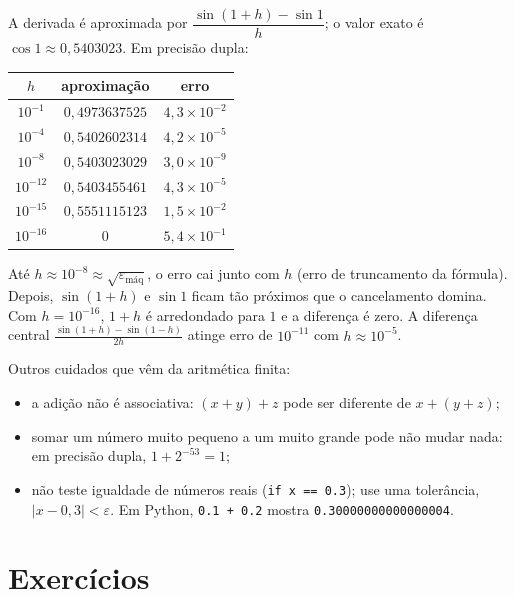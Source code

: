 \begin{exemplo}[{: derivada numérica de $\sin x$ em $x=1$}]
A derivada é aproximada por $\dfrac{\sin(1+h)-\sin 1}{h}$; o valor exato é $\cos1\approx0{,}5403023$. Em precisão dupla:

\begin{center}
\small
\begin{tabular}{ccc}
\toprule
$h$ & aproximação & erro\\
\midrule
$10^{-1}$  & $0{,}4973637525$ & $4{,}3\times10^{-2}$\\
$10^{-4}$  & $0{,}5402602314$ & $4{,}2\times10^{-5}$\\
$10^{-8}$  & $0{,}5403023029$ & $3{,}0\times10^{-9}$\\
$10^{-12}$ & $0{,}5403455461$ & $4{,}3\times10^{-5}$\\
$10^{-15}$ & $0{,}5551115123$ & $1{,}5\times10^{-2}$\\
$10^{-16}$ & $0$ & $5{,}4\times10^{-1}$\\
\bottomrule
\end{tabular}
\end{center}

Até $h\approx10^{-8}\approx\sqrt{\varepsilon_{\text{máq}}}$, o erro cai junto com $h$ (erro de truncamento da
fórmula). Depois, $\sin(1+h)$ e $\sin1$ ficam tão próximos que o cancelamento domina. Com
$h=10^{-16}$, $1+h$ é arredondado para $1$ e a diferença é zero. A diferença central
$\frac{\sin(1+h)-\sin(1-h)}{2h}$ atinge erro de $10^{-11}$ com $h\approx10^{-5}$.
\end{exemplo}

\begin{observacao}
Outros cuidados que vêm da aritmética finita:
\begin{itemize}[nosep]
  \item a adição não é associativa: $(x+y)+z$ pode ser diferente de $x+(y+z)$;
  \item somar um número muito pequeno a um muito grande pode não mudar nada: em precisão dupla,
        $1+2^{-53}=1$;
  \item não teste igualdade de números reais (\texttt{if x == 0.3}); use uma tolerância,
        $|x-0{,}3|<\varepsilon$. Em Python, \texttt{0.1 + 0.2} mostra \texttt{0.30000000000000004}.
\end{itemize}
\end{observacao}



\section{Exercícios}

